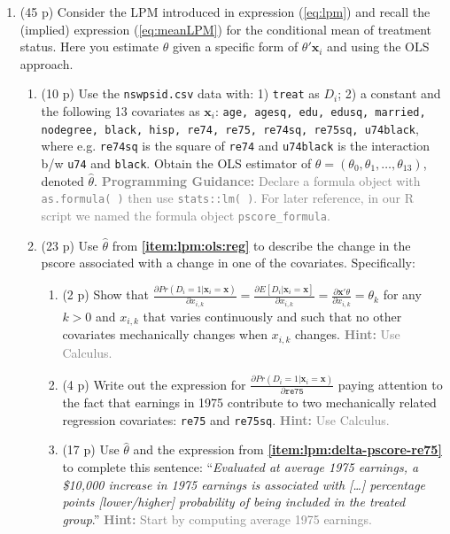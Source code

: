 \documentclass{article}
\begin{document}
\begin{enumerate}[label=\textbf{Q\arabic{enumi}}.,ref=Q\arabic{enumi}, wide=0pt, itemsep=0em, topsep=5pt, labelindent=0pt]
\item (45 p) Consider the LPM introduced in expression (\ref{eq:lpm}) and recall the (implied) expression (\ref{eq:meanLPM}) for the conditional mean of treatment status. Here you estimate $\theta$ given a specific form of $\theta'\mathbf{x}_{i}$ and using the OLS approach.\label{item:lpm:ols}
\begin{enumerate}
\item (10 p) Use the \texttt{nswpsid.csv} data with: 1) \texttt{treat} as $D_i$; 2) a constant and the following 13 covariates as $\mathbf{x}_{i}$: \texttt{age, agesq, edu, edusq, married, nodegree, black, hisp, re74, re75, re74sq, re75sq, u74black}, where e.g. \texttt{re74sq} is the square of \texttt{re74} and \texttt{u74black} is the interaction b/w \texttt{u74} and \texttt{black}. Obtain the OLS estimator of $\theta=(\theta_0,\theta_1,\ldots,\theta_{13})$, denoted $\hat{\theta}$. \textcolor{gray}{\textbf{Programming Guidance:} Declare a formula object with \texttt{as.formula( )} then use \texttt{stats::lm( )}. For later reference, in our R script we named the formula object \texttt{pscore\_formula}.} \label{item:lpm:ols:reg}
\item (23 p) Use $\hat{\theta}$ from \textbf{\ref{item:lpm:ols:reg}} to describe the change in the pscore associated with a change in one of the covariates. Specifically:
\begin{enumerate}
\item (2 p) Show that $\frac{\partial Pr(D_i=1|\mathbf{x}_{i}=\mathbf{x})}{\partial x_{i,k}} = \frac{\partial E[D_i|\mathbf{x}_{i}=\mathbf{x}]}{\partial x_{i,k}}= \frac{\partial \mathbf{x}'\theta}{\partial x_{i,k}} = \theta_k$ for any $k >0$ and $x_{i,k}$ that varies continuously and such that no other covariates mechanically changes when $x_{i,k}$ changes. \textcolor{gray}{\textbf{Hint:} Use Calculus.}
\item (4 p) Write out the expression for $\frac{\partial Pr(D_i=1|\mathbf{x}_{i}=\mathbf{x})}{\partial \texttt{re75}}$ paying attention to the fact that earnings in 1975 contribute to two mechanically related regression covariates: \texttt{re75} and \texttt{re75sq}. \textcolor{gray}{\textbf{Hint:} Use Calculus.}\label{item:lpm:delta-pscore-re75}
\item (17 p) Use $\hat{\theta}$ and the expression from \textbf{\ref{item:lpm:delta-pscore-re75}} to complete this sentence: ``\textit{Evaluated at average 1975 earnings, a \$10,000 increase in 1975 earnings is associated with [\dots] percentage points [lower/higher] probability of being included in the treated group}.'' \textcolor{gray}{\textbf{Hint:} Start by computing average 1975 earnings.}

\end{enumerate}
\end{enumerate}
\end{enumerate}
\end{document}
